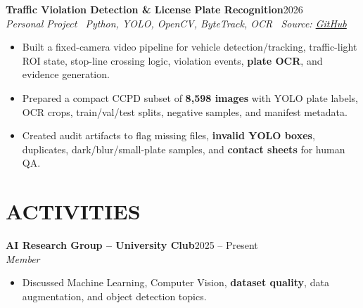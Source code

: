 \documentclass[10pt,a4paper]{article}
\newenvironment{cvitems}{%
    \begin{itemize}[leftmargin=1.2em,itemsep=1pt,topsep=1pt,parsep=0pt]
}{%
    \end{itemize}
}
\newcommand{\entryhead}[2]{%
    \noindent\textbf{#1}\hfill #2\\[-2pt]
}
\newcommand{\entrysub}[1]{%
    \noindent\textit{#1}\\[-1pt]
}
\begin{document}
\entryhead{Traffic Violation Detection \& License Plate Recognition}{2026}
\entrysub{Personal Project \textbar\ Python, YOLO, OpenCV, ByteTrack, OCR \textbar\ Source: \href{https://github.com/NguyenKhacBao564/Traffic-Violation-Detection-and-License-Plate-Recognition}{GitHub}}
\begin{cvitems}
    \item Built a fixed-camera video pipeline for vehicle detection/tracking, traffic-light ROI state, stop-line crossing logic, violation events, \textbf{plate OCR}, and evidence generation.
    \item Prepared a compact CCPD subset of \textbf{8,598 images} with YOLO plate labels, OCR crops, train/val/test splits, negative samples, and manifest metadata.
    \item Created audit artifacts to flag missing files, \textbf{invalid YOLO boxes}, duplicates, dark/blur/small-plate samples, and \textbf{contact sheets} for human QA.
\end{cvitems}

\section{ACTIVITIES}
\entryhead{AI Research Group -- University Club}{2025 -- Present}
\entrysub{Member}
\begin{cvitems}
    \item Discussed Machine Learning, Computer Vision, \textbf{dataset quality}, data augmentation, and object detection topics.
\end{cvitems}
\end{document}

